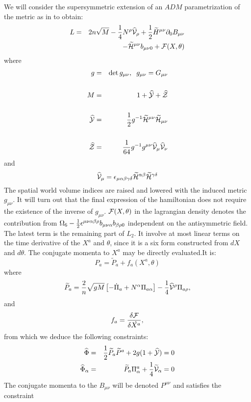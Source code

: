 \documentclass[a4paper,12pt]{article}
\def\ds{\displaystyle}
\def\CH{\widetilde{\cal{H}}}
\def\CF{\cal{F}}
\def\wp{\widetilde{P}}
\def\CV{\cal{V}}
\def\CY{\cal{Y}}
\def\CZ{\cal{Z}}
\begin{document}
We will consider the supersymmetric extension of an $ADM$
parametrization of the metric \cite{ADM61} as in
\cite{DeCastro:2001gp} to obtain:
\begin{eqnarray}
L&=&2n\sqrt{M} -\frac{1}{4}N^\rho
\widehat{\cal{V}}_\rho+\frac{1}{2}\widetilde{H}^{\mu\nu}\partial_0{B}_{\mu\nu}\\
&&-{\CH^{\mu\nu}}b_{\mu\nu0}+{\CF}(X,\theta)\nonumber
\end{eqnarray}
where
\begin{eqnarray*}
g&=&\det{g_{\mu\nu}}, \;\; g_{\mu\nu}=G_{\mu\nu}\cr\cr
M&=&1+\widehat{\CY}+\widehat{\CZ}\cr\cr \widehat{\CY}&=&{1\over
2}g^{-1}{\CH^{\mu\nu}}{\CH_{\mu\nu}}\cr\cr \widehat{\CZ}&=&{1\over
64}g^{-1}g^{\mu\nu}\widehat{\CV}_\mu\widehat{\CV}_\nu
\end{eqnarray*}
and
\[
\widehat{\CV}_\mu=\epsilon_{\mu\alpha\beta\gamma\delta}{\CH^{\alpha\beta}}{\CH^{\gamma\delta}}
\]
The spatial world volume indices are raised and lowered with the
induced metric $g_{\mu\nu}$. It will turn out that the final
expression of the hamiltonian does not require the existence of
the inverse  of $g_{\mu\nu}$. ${\CF}(X,\theta)$ in the lagrangian
density denotes the contribution from $\Omega_6-{1\over
2}\epsilon^{\mu\nu\alpha\beta\rho}b_{\mu\nu\alpha}b_{\beta\rho0}$
 independent on the antisymmetric field. The latest term is the remaining part of
 $L_2$. It involve at most
linear terms on the time derivative of the $X^a$ and $\theta$,
since it is a six form constructed from $dX$ and $d\theta$. The
conjugate momenta to $X^a$ may be directly evaluated.It is:
\begin{equation*}\label{}
P_a=\wp_a+f_a(X^a,\theta)
\end{equation*}
where
\begin{equation*} \wp_a ={2\over
n}\sqrt{gM}\left[-{\dot{\Pi}}_a+N^{\alpha}\Pi_{a\alpha}\right]-{1\over
4}\widehat{\CV}^\rho\Pi_{a\rho},
\end{equation*}
and
\begin{equation*}
f_a=\ds\frac{\delta{\CF}}{\delta \dot{X^a}},
\end{equation*}
from which we deduce the following constraints:
\begin{eqnarray}
\widehat{\Phi}
&=&{1\over 2}\wp_a\wp^a+2g(1+{\widehat{\CY}})=0\label{phi}\\
\widehat{\Phi}_\alpha
&=&\wp_a\Pi^a_\alpha+\frac{1}{4}{\widetilde{\CV}}_\alpha=0\label{phia}
\end{eqnarray}
The conjugate momenta to the $B_{\mu\nu}$ will be denoted
$P^{\mu\nu}$ and satisfies the constraint
\end{document}
